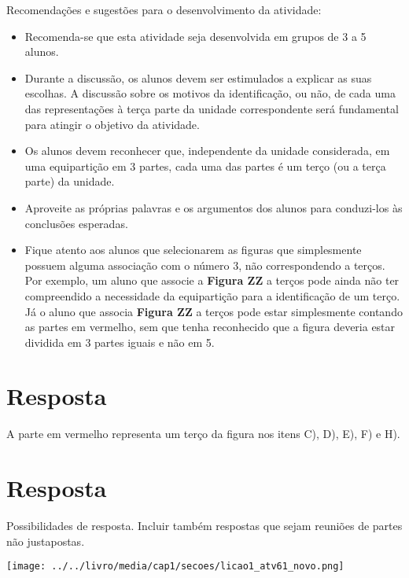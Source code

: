 \documentclass{book}
\begin{document}
  Recomendações e sugestões para o desenvolvimento da atividade:
\begin{itemize} %
    \item       Recomenda-se que esta atividade seja desenvolvida em grupos de 3 a 5 alunos.
    \item       Durante a discussão, os alunos devem ser estimulados a explicar as suas escolhas. A discussão sobre os motivos da identificação, ou não, de cada uma das representações à terça parte da unidade correspondente será fundamental para atingir o objetivo da atividade.
    \item       Os alunos devem reconhecer que, independente da unidade considerada, em uma equipartição em 3 partes, cada uma das partes é um terço (ou a terça parte) da unidade.
    \item       Aproveite as próprias palavras e os argumentos dos alunos para conduzi-los às conclusões esperadas.
    \item       Fique atento aos alunos que selecionarem as figuras que simplesmente possuem alguma associação com o número 3, não correspondendo a terços. Por exemplo, um aluno que associe a       {\bf Figura ZZ}       a terços pode ainda não ter compreendido a necessidade da equipartição para a identificação de um terço. Já o aluno que associa       {\bf Figura ZZ}       a terços pode estar simplesmente contando as partes em vermelho, sem que tenha reconhecido que a figura deveria estar dividida em 3 partes iguais e não em 5.
\end{itemize} %

\newpage


\section{Resposta}
A parte em vermelho representa um terço da figura nos itens C), D), E), F) e H).

\newpage


\section{Resposta}  
  Possibilidades de resposta. Incluir também respostas que sejam reuniões de partes não justapostas.  
  
    \texttt{[image: ../../livro/media/cap1/secoes/licao1\_atv61\_novo.png]}  
  
\end{document}
